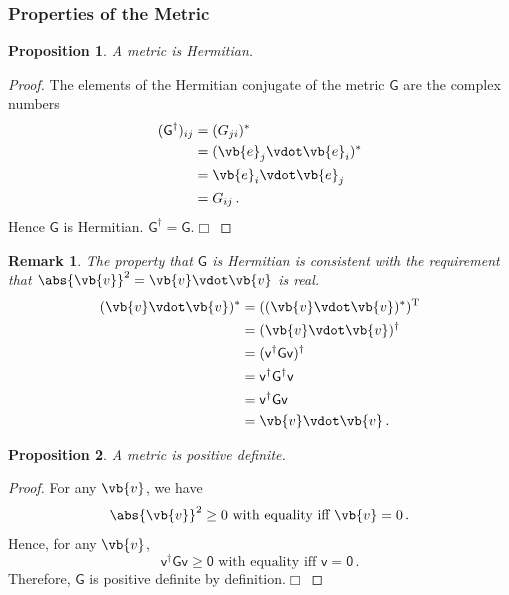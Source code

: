 \documentclass{article}
\theoremstyle{plain}\theoremheaderfont{\normalfont\itshape}\theorembodyfont{\rmfamily}\theoremseparator{.}\newtheorem*{rem}{Remark}\newtheorem*{ex}{Example}\newtheorem*{proof}{Proof}\newtheorem*{altp}{Alternative proof}
\theoremstyle{plain}\theoremheaderfont{\normalfont\bfseries}\theorembodyfont{\rmfamily}\theoremseparator{.}\newtheorem{thm}{Theorem}[section]\newtheorem{lem}[thm]{Lemma}\newtheorem{prop}[thm]{Proposition}\newtheorem*{cor}{Corollary}\newtheorem{defn}[thm]{Definition}\newtheorem{clm}[thm]{Claim}\newtheorem{clminproof}{Claim}
\theoremstyle{break}\theoremheaderfont{\normalfont\itshape}\theorembodyfont{\rmfamily}\theoremseparator{.\medskip}\newtheorem*{proofskip}{Proof}\newtheorem*{exs}{Examples}\newtheorem*{rems}{Remarks}
\theoremstyle{break}\theoremheaderfont{\normalfont\bfseries}\theorembodyfont{\rmfamily}\theoremseparator{.\medskip}\newtheorem{lemskip}[thm]{Lemma}\newtheorem{defnskip}[thm]{Definition}\newtheorem{propskip}[thm]{Proposition}\newtheorem{thmskip}[thm]{Theorem}
\numberwithin{equation}{section}
\newcommand{\qed}{\hfill\ensuremath{\Box}}
\begin{document}
	\subsubsection{Properties of the Metric}
	\begin{prop}
		A metric is Hermitian.
	\end{prop}
	\begin{proof}
		The elements of the Hermitian conjugate of the metric \(\mathsf{G}\) are the complex numbers
		\begin{align*}
			(\mathsf{G}^\dagger)_{ij}&=(G_{ji})^*\\
			&=(\vb{e}_j\vdot\vb{e}_i)^*\\
			&=\vb{e}_i\vdot\vb{e}_j\\
			&=G_{ij}\,.
		\end{align*}
		Hence \(\mathsf{G}\) is Hermitian. \(\mathsf{G^\dagger=G}\).\qed
	\end{proof}
	\begin{rem}
		The property that \(\mathsf{G}\) is Hermitian is consistent with the requirement that \(\abs{\vb{v}}^2=\vb{v}\vdot\vb{v}\) is real.
		\begin{align*}
			(\vb{v}\vdot\vb{v})^*&=((\vb{v}\vdot\vb{v})^*)^{\mathrm{T}}\\
			&=(\vb{v}\vdot\vb{v})^\dagger\\
			&=(\mathsf{v^\dagger Gv})^\dagger\\
			&=\mathsf{v^\dagger G^\dagger v}\\
			&=\mathsf{v^\dagger Gv}\\
			&=\vb{v}\vdot\vb{v}\,.
		\end{align*}
	\end{rem}
	\begin{prop}
		A metric is positive definite.
	\end{prop}
	\begin{proof}
		For any \(\vb{v}\), we have
		\[\abs{\vb{v}}^2\ge 0\text{ with equality iff }\vb{v}=0\,.\]
		Hence, for any \(\vb{v}\),
		\[\mathsf{v^\dagger Gv}\ge\mathsf{0}\text{ with equality iff }\mathsf{v=0}\,.\]
		Therefore, \(\mathsf{G}\) is positive definite by definition.\qed
	\end{proof}
\end{document}
